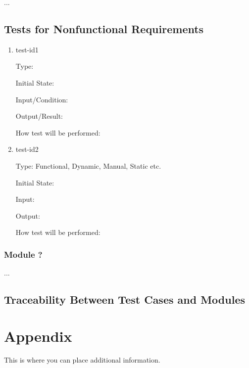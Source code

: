 \documentclass[12pt, titlepage]{article}
\begin{document}
...

\subsection{Tests for Nonfunctional Requirements}
		
\begin{enumerate}

\item{test-id1\\}

Type: 
					
Initial State: 
					
Input/Condition: 
					
Output/Result: 
					
How test will be performed: 
					
\item{test-id2\\}

Type: Functional, Dynamic, Manual, Static etc.
					
Initial State: 
					
Input: 
					
Output: 
					
How test will be performed: 

\end{enumerate}

\subsubsection{Module ?}

...

\subsection{Traceability Between Test Cases and Modules}

				




\newpage

\section{Appendix}

This is where you can place additional information.
\end{document}
